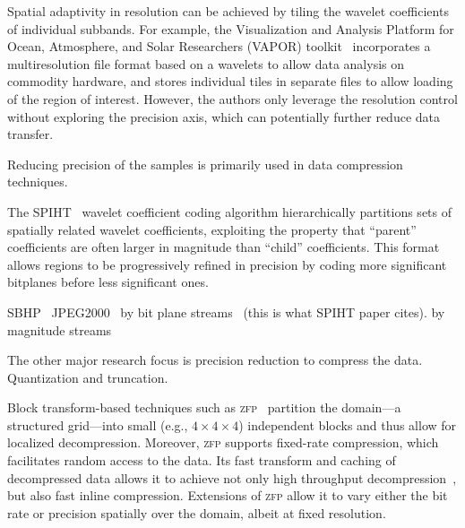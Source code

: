 Spatial adaptivity in resolution can be achieved by tiling the wavelet coefficients of individual
subbands. For example, the Visualization and Analysis Platform for Ocean, Atmosphere, and Solar
Researchers (VAPOR) toolkit~\cite{multires_toolkit2003, vapor2007} incorporates a multiresolution
file format based on a wavelets to allow data analysis on commodity hardware, and stores individual
tiles in separate files to allow loading of the region of interest. However, the authors only
leverage the resolution control without exploring the precision axis, which can potentially further
reduce data transfer.

Reducing precision of the samples is primarily used in data compression techniques. 

The SPIHT~\cite{spiht1996} wavelet coefficient coding algorithm hierarchically partitions sets of
spatially related wavelet coefficients, exploiting the property that ``parent'' coefficients are
often larger in magnitude than ``child'' coefficients. This format allows regions to be
progressively refined in precision by coding more significant bitplanes before less significant
ones.

SBHP~\cite{sbhp2000}
JPEG2000~\cite{jpeg2001}
by bit plane streams~\cite{compression_techniques1991} (this is what SPIHT paper cites).
by magnitude streams~\cite{image_compression1992}

The other major research focus is precision reduction to compress the data. Quantization and
truncation.


\newcommand{\zfp}{\textsc{zfp}\xspace}
Block transform-based techniques such as \zfp~\cite{zfp2014} partition the domain---a structured
grid---into small (e.g., $4 \times 4 \times 4$) independent blocks and thus allow for localized
decompression. Moreover, \zfp supports fixed-rate compression, which facilitates random access to
the data. Its fast transform and caching of decompressed data allows it to achieve not only high
throughput decompression~\cite{hvq}, but also fast inline compression. Extensions of \zfp allow it
to vary either the bit rate or precision spatially over the domain, albeit at fixed resolution.

